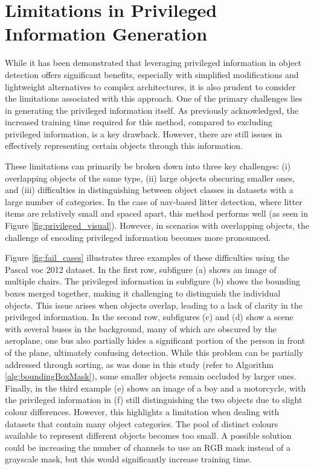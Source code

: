 \section{Limitations in Privileged Information Generation}
\label{sec:5_fail_cases_priv_info_gen}

While it has been demonstrated that leveraging privileged information in object detection offers significant benefits, especially with simplified modifications and lightweight alternatives to complex architectures, it is also prudent to consider the limitations associated with this approach. One of the primary challenges lies in generating the privileged information itself. As previously acknowledged, the increased training time required for this method, compared to excluding privileged information, is a key drawback. However, there are still issues in effectively representing certain objects through this information.

These limitations can primarily be broken down into three key challenges: (i) overlapping objects of the same type, (ii) large objects obscuring smaller ones, and (iii) difficulties in distinguishing between object classes in datasets with a large number of categories. In the case of \gls{uav}-based litter detection, where litter items are relatively small and spaced apart, this method performs well (as seen in Figure \ref{fig:privileged_visual}). However, in scenarios with overlapping objects, the challenge of encoding privileged information becomes more pronounced.

Figure \ref{fig:fail_cases} illustrates three examples of these difficulties using the Pascal \gls{voc} 2012 dataset. In the first row, subfigure (a) shows an image of multiple chairs. The privileged information in subfigure (b) shows the bounding boxes merged together, making it challenging to distinguish the individual objects. This issue arises when objects overlap, leading to a lack of clarity in the privileged information. In the second row, subfigures (c) and (d) show a scene with several buses in the background, many of which are obscured by the aeroplane, one bus also partially hides a significant portion of the person in front of the plane, ultimately confusing detection. While this problem can be partially addressed through sorting, as was done in this study (refer to Algorithm \ref{alg:boundingBoxMask}), some smaller objects remain occluded by larger ones. Finally, in the third example (e) shows an image of a boy and a motorcycle, with the privileged information in (f) still distinguishing the two objects due to slight colour differences. However, this highlights a limitation when dealing with datasets that contain many object categories. The pool of distinct colours available to represent different objects becomes too small. A possible solution could be increasing the number of channels to use an RGB mask instead of a grayscale mask, but this would significantly increase training time.

